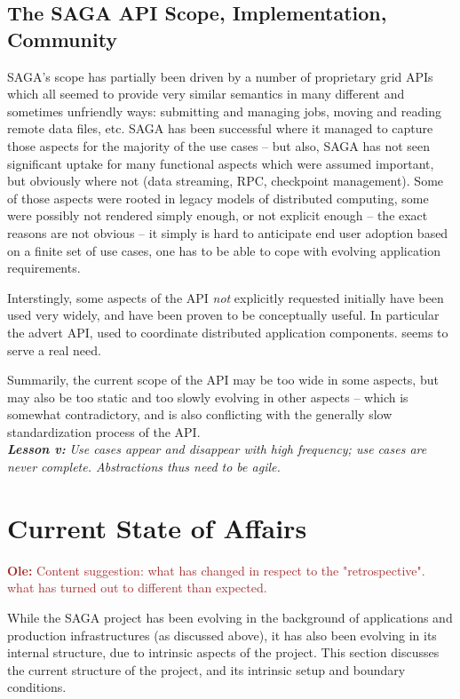 \documentclass[]{article}
\newcommand{\I}[1]{\textit{#1}}
\newcommand{\B}[1]{\textbf{#1}}
\newcommand{\BI}[1]{\textbf{\textit{#1}}}
\newcommand{\ownote}[1]{{\textcolor{Brown}{   \B{Ole:     } #1 }}}
\newcommand{\ownote}[1]{}
\begin{document}
 \subsection{The SAGA API Scope, Implementation, Community}

  SAGA's scope has partially been driven by a number of proprietary grid APIs
  which all seemed to provide very similar semantics in many different and
  sometimes unfriendly ways: submitting and managing jobs, moving and reading
  remote data files, etc.  SAGA has been successful where it managed to capture
  those aspects for the majority of the use cases -- but also, SAGA has not seen
  significant uptake for many functional aspects which were assumed important,
  but obviously where not (data streaming, RPC, checkpoint management).  Some of
  those aspects were rooted in legacy models of distributed computing, some were
  possibly not rendered simply enough, or not explicit enough -- the exact
  reasons are not obvious -- it simply is hard to anticipate end user adoption
  based on a finite set of use cases, one has to be able to cope with evolving
  application requirements.

  Interstingly, some aspects of the API \I{not} explicitly requested initially
  have been used very widely, and have been proven to be conceptually useful.
  In particular the advert API, used to coordinate distributed application
  components. seems to serve a real need.

  Summarily, the current scope of the API may be too wide in some aspects, but
  may also be too static and too slowly evolving in other aspects -- which is
  somewhat contradictory, and is also conflicting with the generally slow
  standardization process of the API.\\
  \BI{Lesson v:} \I{Use cases appear and disappear with high frequency; use
  cases are never complete.  Abstractions thus need to be agile.}



\section{Current State of Affairs}
\label{sec:state}

 \ownote{Content suggestion: what has changed in respect to the
 "retrospective". what has turned out to different than expected.}

While the SAGA project has been evolving in the background of
applications and production infrastructures (as discussed above), it
has also been evolving in its internal structure, due to intrinsic
aspects of the project.  This section discusses the current structure
of the project, and its intrinsic setup and boundary conditions.
\end{document}
